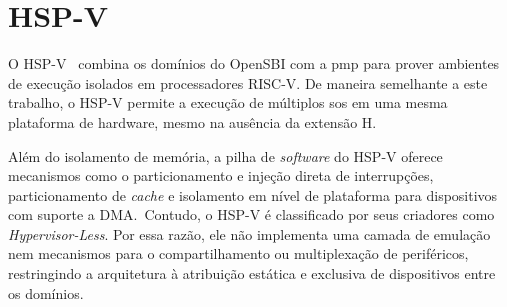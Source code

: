 \section{HSP-V}

O HSP-V~\cite{hsp-v} combina os domínios do OpenSBI com a \gls{pmp} para prover ambientes de execução isolados em processadores RISC-V.
De maneira semelhante a este trabalho, o HSP-V permite a execução de múltiplos \glspl{so} em uma mesma plataforma de hardware, mesmo na ausência da extensão H.

Além do isolamento de memória, a pilha de \textit{software} do HSP-V oferece mecanismos como o particionamento e injeção direta de interrupções, particionamento de \textit{cache} e
isolamento em nível de plataforma para dispositivos com suporte a DMA.~Contudo, o HSP-V é classificado por seus criadores como \textit{Hypervisor-Less}. Por essa razão, ele não implementa uma camada de emulação nem mecanismos para o compartilhamento ou multiplexação
de periféricos, restringindo a arquitetura à atribuição estática e exclusiva de dispositivos entre os domínios.

